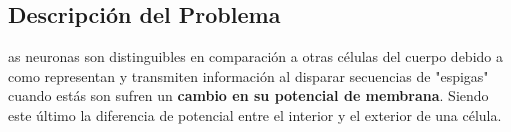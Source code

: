 \documentclass[10pt,journal,compsoc]{IEEEtran}
\begin{document}
\maketitle


\IEEEdisplaynontitleabstractindextext



%
\IEEEpeerreviewmaketitle



\subsection{Descripción del Problema}
as neuronas son distinguibles en comparación a otras células
del cuerpo debido a como representan y transmiten información al disparar
secuencias de "espigas" cuando estás son sufren un \textbf{cambio en su
potencial de membrana}. Siendo este último la diferencia de potencial entre el
interior y el exterior de una célula.
\end{document}

